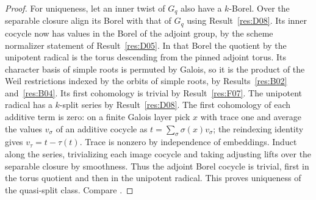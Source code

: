 \documentclass[11pt,a4paper,openany,oneside]{book}
\theoremstyle{resultstyle}
\theoremstyle{definition}
\numberwithin{equation}{chapter}
\begin{document}
\begin{proof}
For uniqueness, let an inner twist of \(G_q\) also
have a \(k\)-Borel. Over the separable closure
align its Borel with that of \(G_q\) using
Result~\ref{res:D08}. Its inner cocycle now has values
in the Borel of the adjoint group, by the scheme
normalizer statement of Result~\ref{res:D05}.
In that Borel the quotient by the unipotent radical
is the torus descending from the pinned adjoint
torus. Its character basis of simple roots is permuted
by Galois, so it is the product of the Weil restrictions
indexed by the orbits of simple roots, by
Results~\ref{res:B02} and~\ref{res:B04}. Its first
cohomology is trivial by Result~\ref{res:F07}.
The unipotent radical has a \(k\)-split series by
Result~\ref{res:D08}. The first cohomology of each
additive term is zero: on a finite Galois layer pick
\(x\) with trace one and average the values \(v_\sigma\)
of an additive cocycle as \(t=\sum_\sigma\sigma(x)v_\sigma\);
the reindexing identity gives \(v_\tau=t-\tau(t)\).
Trace is nonzero by independence of embeddings.
Induct along the series, trivializing each image
cocycle and taking adjusting lifts over the separable
closure by smoothness.
Thus the adjoint Borel cocycle is trivial, first in
the torus quotient and then in the unipotent radical.
This proves uniqueness of the quasi-split class.
Compare \cite[Section 7.2]{conrad}.
\end{proof}
\end{document}
